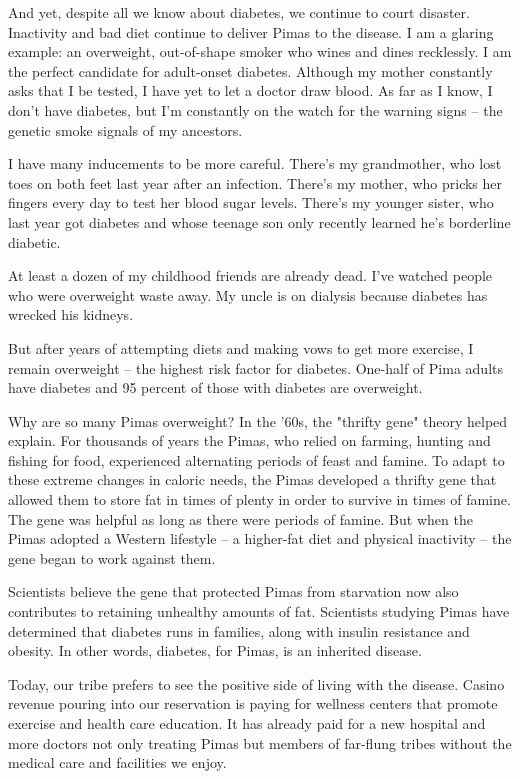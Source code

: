 \documentclass[12pt]{article}
\begin{document}
And yet, despite all we know about diabetes, we continue to court disaster. Inactivity and bad diet continue to deliver Pimas to the disease. I am a glaring example: an overweight, out-of-shape smoker who wines and dines recklessly. I am the perfect candidate for adult-onset diabetes. Although my mother constantly asks that I be tested, I have yet to let a doctor draw blood. As far as I know, I don't have diabetes, but I'm constantly on the watch for the warning signs -- the genetic smoke signals of my ancestors.

I have many inducements to be more careful. There's my grandmother, who lost toes on both feet last year after an infection. There's my mother, who pricks her fingers every day to test her blood sugar levels. There's my younger sister, who last year got diabetes and whose teenage son only recently learned he's borderline diabetic.

At least a dozen of my childhood friends are already dead. I've watched people who were overweight waste away. My uncle is on dialysis because diabetes has wrecked his kidneys.

But after years of attempting diets and making vows to get more exercise, I remain overweight -- the highest risk factor for diabetes. One-half of Pima adults have diabetes and 95 percent of those with diabetes are overweight.

Why are so many Pimas overweight? In the '60s, the "thrifty gene" theory helped explain. For thousands of years the Pimas, who relied on farming, hunting and fishing for food, experienced alternating periods of feast and famine. To adapt to these extreme changes in caloric needs, the Pimas developed a thrifty gene that allowed them to store fat in times of plenty in order to survive in times of famine. The gene was helpful as long as there were periods of famine. But when the Pimas adopted a Western lifestyle -- a higher-fat diet and physical inactivity -- the gene began to work against them.

Scientists believe the gene that protected Pimas from starvation now also contributes to retaining unhealthy amounts of fat. Scientists studying Pimas have determined that diabetes runs in families, along with insulin resistance and obesity. In other words, diabetes, for Pimas, is an inherited disease.

Today, our tribe prefers to see the positive side of living with the disease. Casino revenue pouring into our reservation is paying for wellness centers that promote exercise and health care education. It has already paid for a new hospital and more doctors not only treating Pimas but members of far-flung tribes without the medical care and facilities we enjoy.
\end{document}

